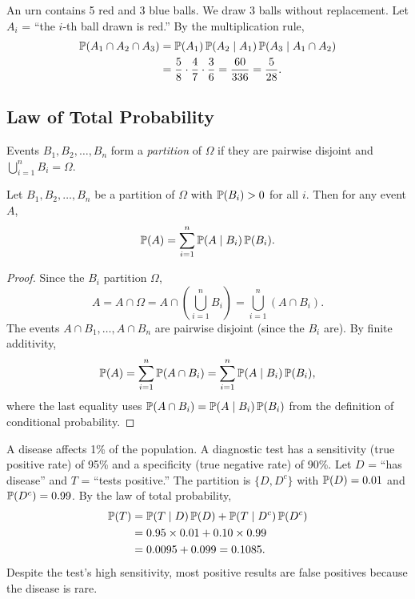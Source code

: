 \documentclass[11pt,a4paper]{article}
\begin{document}
\begin{example}
\label{ex:draw_without_replacement}
An urn contains 5 red and 3 blue balls. We draw 3 balls without
replacement. Let $A_i$ = ``the $i$-th ball drawn is red.'' By the
multiplication rule,
\begin{align*}
    \mathbb{P}(A_1 \cap A_2 \cap A_3)
    &= \mathbb{P}(A_1) \, \mathbb{P}(A_2 \mid A_1) \,
       \mathbb{P}(A_3 \mid A_1 \cap A_2) \\
    &= \frac{5}{8} \cdot \frac{4}{7} \cdot \frac{3}{6}
    = \frac{60}{336} = \frac{5}{28}.
\end{align*}
\end{example}

\subsection{Law of Total Probability}

\begin{definition}[Partition]
\label{def:partition}
Events $B_1, B_2, \ldots, B_n$ form a \emph{partition} of $\Omega$ if
they are pairwise disjoint and $\bigcup_{i=1}^n B_i = \Omega$.
\end{definition}

\begin{theorem}
\label{thm:total_prob}
Let $B_1, B_2, \ldots, B_n$ be a partition of $\Omega$ with
$\mathbb{P}(B_i) > 0$ for all $i$. Then for any event $A$,
\[
    \mathbb{P}(A) = \sum_{i=1}^n \mathbb{P}(A \mid B_i) \, \mathbb{P}(B_i).
\]
\end{theorem}

\begin{proof}
Since the $B_i$ partition $\Omega$,
\[
    A = A \cap \Omega = A \cap \left(\bigcup_{i=1}^n B_i\right)
    = \bigcup_{i=1}^n (A \cap B_i).
\]
The events $A \cap B_1, \ldots, A \cap B_n$ are pairwise disjoint (since
the $B_i$ are). By finite additivity,
\[
    \mathbb{P}(A) = \sum_{i=1}^n \mathbb{P}(A \cap B_i)
    = \sum_{i=1}^n \mathbb{P}(A \mid B_i) \, \mathbb{P}(B_i),
\]
where the last equality uses
$\mathbb{P}(A \cap B_i) = \mathbb{P}(A \mid B_i) \, \mathbb{P}(B_i)$ from the definition
of conditional probability.
\end{proof}

\begin{example}
\label{ex:medical_total}
A disease affects 1\% of the population. A diagnostic test has a
sensitivity (true positive rate) of 95\% and a specificity (true negative
rate) of 90\%. Let $D$ = ``has disease'' and $T$ = ``tests positive.''
The partition is $\{D, D^c\}$ with $\mathbb{P}(D) = 0.01$ and
$\mathbb{P}(D^c) = 0.99$. By the law of total probability,
\begin{align*}
    \mathbb{P}(T) &= \mathbb{P}(T \mid D) \, \mathbb{P}(D)
               + \mathbb{P}(T \mid D^c) \, \mathbb{P}(D^c) \\
             &= 0.95 \times 0.01 + 0.10 \times 0.99 \\
             &= 0.0095 + 0.099 = 0.1085.
\end{align*}
Despite the test's high sensitivity, most positive results are false
positives because the disease is rare.
\end{example}
\end{document}
